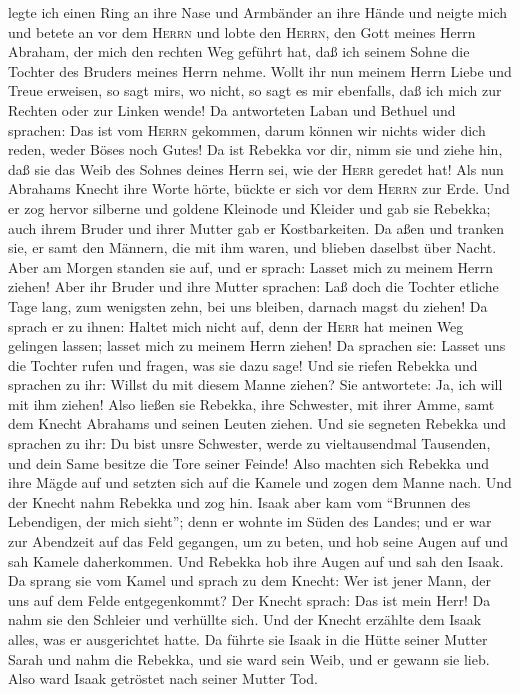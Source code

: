 legte ich einen Ring an ihre Nase und Armbänder an ihre Hände
 und neigte mich und betete an vor dem \textsc{Herrn} und
lobte den \textsc{Herrn}, den Gott meines Herrn Abraham, der mich den
rechten Weg geführt hat, daß ich seinem Sohne die Tochter des Bruders
meines Herrn nehme.  Wollt ihr nun meinem Herrn Liebe und
Treue erweisen, so sagt mir\textquotesingle s, wo nicht, so sagt es mir
ebenfalls, daß ich mich zur Rechten oder zur Linken wende!
 Da antworteten Laban und Bethuel und sprachen: Das ist
vom \textsc{Herrn} gekommen, darum können wir nichts wider dich reden,
weder Böses noch Gutes!  Da ist Rebekka vor dir, nimm sie
und ziehe hin, daß sie das Weib des Sohnes deines Herrn sei, wie der
\textsc{Herr} geredet hat!  Als nun Abrahams Knecht ihre
Worte hörte, bückte er sich vor dem \textsc{Herrn} zur Erde.
 Und er zog hervor silberne und goldene Kleinode und
Kleider und gab sie Rebekka; auch ihrem Bruder und ihrer Mutter gab er
Kostbarkeiten.  Da aßen und tranken sie, er samt den
Männern, die mit ihm waren, und blieben daselbst über Nacht. Aber am
Morgen standen sie auf, und er sprach: Lasset mich zu meinem Herrn
ziehen!  Aber ihr Bruder und ihre Mutter sprachen: Laß
doch die Tochter etliche Tage lang, zum wenigsten zehn, bei uns bleiben,
darnach magst du ziehen!  Da sprach er zu ihnen: Haltet
mich nicht auf, denn der \textsc{Herr} hat meinen Weg gelingen lassen;
lasset mich zu meinem Herrn ziehen!  Da sprachen sie:
Lasset uns die Tochter rufen und fragen, was sie dazu sage!
 Und sie riefen Rebekka und sprachen zu ihr: Willst du
mit diesem Manne ziehen? Sie antwortete: Ja, ich will mit ihm ziehen!
 Also ließen sie Rebekka, ihre Schwester, mit ihrer Amme,
samt dem Knecht Abrahams und seinen Leuten ziehen.  Und
sie segneten Rebekka und sprachen zu ihr: Du bist unsre Schwester, werde
zu vieltausendmal Tausenden, und dein Same besitze die Tore seiner
Feinde!  Also machten sich Rebekka und ihre Mägde auf und
setzten sich auf die Kamele und zogen dem Manne nach. Und der Knecht
nahm Rebekka und zog hin.  Isaak aber kam vom ``Brunnen
des Lebendigen, der mich sieht''; denn er wohnte im Süden des Landes;
 und er war zur Abendzeit auf das Feld gegangen, um zu
beten, und hob seine Augen auf und sah Kamele daherkommen.
 Und Rebekka hob ihre Augen auf und sah den Isaak. Da
sprang sie vom Kamel  und sprach zu dem Knecht: Wer ist
jener Mann, der uns auf dem Felde entgegenkommt? Der Knecht sprach: Das
ist mein Herr! Da nahm sie den Schleier und verhüllte sich.
 Und der Knecht erzählte dem Isaak alles, was er
ausgerichtet hatte.  Da führte sie Isaak in die Hütte
seiner Mutter Sarah und nahm die Rebekka, und sie ward sein Weib, und er
gewann sie lieb. Also ward Isaak getröstet nach seiner Mutter Tod.

